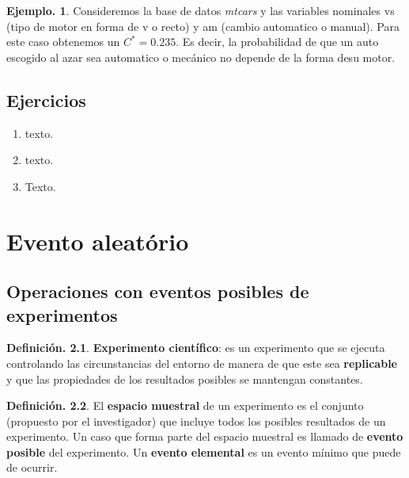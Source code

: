 \documentclass[]{book}
\theoremstyle{definition}
\newtheorem{definition}{Definición.}[chapter]
\theoremstyle{definition}
\newtheorem{example}{Ejemplo.}[chapter]
\theoremstyle{definition}
\theoremstyle{remark}
\begin{document}
\begin{example}
\protect\hypertarget{exm:unnamed-chunk-113}{}{\label{exm:unnamed-chunk-113} }
Consideremos la base de datos \emph{mtcars} y las variables nominales
vs (tipo de motor en forma de v o recto) y am (cambio automatico o
manual).
Para este caso obtenemos un \(C^{*}=0.235\). Es decir, la probabilidad
de que un auto escogido al
azar sea automatico o
mecánico no depende de
la forma desu motor.
\end{example}

\hypertarget{ejercicios}{%
\section{Ejercicios}\label{ejercicios}}

\begin{enumerate}
\def\labelenumi{\arabic{enumi}.}
\item
  texto.
\item
  texto.
\item
  Texto.
\end{enumerate}

\hypertarget{prob}{%
\chapter{Evento aleatório}\label{prob}}

\hypertarget{operaciones-con-eventos-posibles-de-experimentos}{%
\section{Operaciones con eventos posibles de experimentos}\label{operaciones-con-eventos-posibles-de-experimentos}}

\begin{definition}
\protect\hypertarget{def:unnamed-chunk-114}{}{\label{def:unnamed-chunk-114} }
\textbf{Experimento científico}: es un experimento que se
ejecuta controlando
las circunstancias del entorno de manera de que este sea
\textbf{replicable} y
que las propiedades de los resultados posibles se
mantengan constantes.
\end{definition}

\begin{definition}
\protect\hypertarget{def:unnamed-chunk-115}{}{\label{def:unnamed-chunk-115} }
El \textbf{espacio muestral} de un experimento es el conjunto
(propuesto por el
investigador) que incluye todos los posibles resultados
de un experimento. Un caso que forma parte del espacio
muestral es llamado de \textbf{evento posible} del
experimento.
Un \textbf{evento elemental} es un evento mínimo que puede de
ocurrir.
\end{definition}
\end{document}
